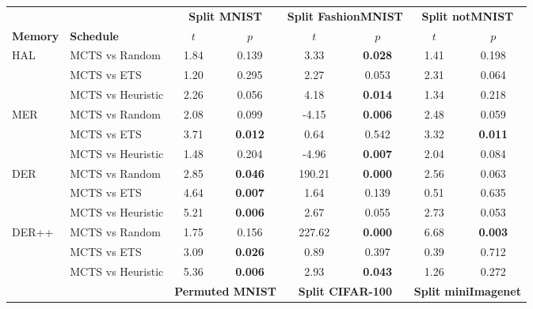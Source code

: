 \begin{tabular}{llcccccc}
\toprule
                       &                   & \multicolumn{2}{c}{\textbf{Split MNIST}} & \multicolumn{2}{c}{\textbf{Split FashionMNIST}} & \multicolumn{2}{c}{\textbf{Split notMNIST}} \\ 
\cmidrule(lr){3-4} \cmidrule(lr){5-6} \cmidrule(lr){7-8}
\textbf{Memory}        & \textbf{Schedule} & $t$      & $p$          & $t$        & $p$          & $t$      & $p$          \\ \midrule
\multirow{3}{*}{HAL}   & MCTS vs Random    & 1.84 & 0.139 & 3.33   & \textbf{0.028} & 1.41 & 0.198 \\
                       & MCTS vs ETS       & 1.20 & 0.295 & 2.27   & 0.053 & 2.31 & 0.064 \\
                       & MCTS vs Heuristic   & 2.26 & 0.056 & 4.18   & \textbf{0.014} & 1.34 & 0.218 \\ \midrule
\multirow{3}{*}{MER}   & MCTS vs Random    & 2.08 & 0.099 & -4.15  & \textbf{0.006} & 2.48 & 0.059 \\
                       & MCTS vs ETS       & 3.71 & \textbf{0.012} & 0.64   & 0.542 & 3.32 & \textbf{0.011} \\
                       & MCTS vs Heuristic   & 1.48 & 0.204 & -4.96  & \textbf{0.007} & 2.04 & 0.084 \\ \midrule
\multirow{3}{*}{DER}   & MCTS vs Random    & 2.85 & \textbf{0.046} & 190.21 & \textbf{0.000} & 2.56 & 0.063 \\
                       & MCTS vs ETS       & 4.64 & \textbf{0.007} & 1.64   & 0.139 & 0.51 & 0.635 \\
                       & MCTS vs Heuristic   & 5.21 & \textbf{0.006} & 2.67   & 0.055 & 2.73 & 0.053 \\ \midrule
\multirow{3}{*}{DER++} & MCTS vs Random    & 1.75 & 0.156 & 227.62 & \textbf{0.000} & 6.68 & \textbf{0.003} \\
                       & MCTS vs ETS       & 3.09 & \textbf{0.026} & 0.89   & 0.397 & 0.39 & 0.712 \\
                       & MCTS vs Heuristic   & 5.36 & \textbf{0.006} & 2.93   & \textbf{0.043} & 1.26 & 0.272 \\
\bottomrule \toprule
                       &                   & \multicolumn{2}{c}{\textbf{Permuted MNIST}} & \multicolumn{2}{c}{\textbf{Split CIFAR-100}} & \multicolumn{2}{c}{\textbf{Split miniImagenet}} \\
\cmidrule(lr){3-4} \cmidrule(lr){5-6} \cmidrule(lr){7-8}

\end{tabular}
